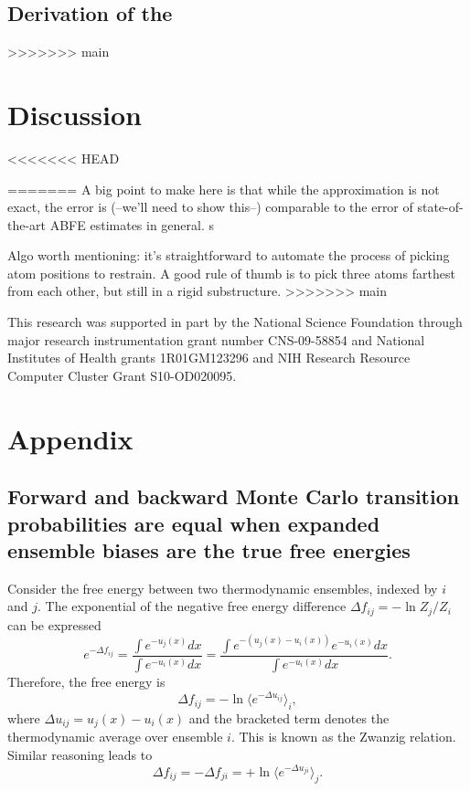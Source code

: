 \documentclass[%
 aip,
rsi,%
 amsmath,amssymb,
 reprint,%
]{revtex4-1}
\begin{document}
\subsection*{Derivation of the }
>>>>>>> main




\section*{Discussion}

<<<<<<< HEAD

=======
A big point to make here is that while the approximation is not exact, the error is (--we'll need to show this--) comparable to the error of state-of-the-art ABFE estimates in general.  s 

Algo worth mentioning: it's straightforward to automate the process of picking atom positions to restrain.  A good rule of thumb is to pick three atoms farthest from each other, but still in a rigid substructure. 
>>>>>>> main

\begin{acknowledgments}
This research was supported in part by the National Science Foundation through major research instrumentation grant number CNS-09-58854 and National Institutes of Health grants 1R01GM123296 and NIH Research Resource Computer Cluster Grant S10-OD020095.
\end{acknowledgments}

%




\section*{Appendix}

\subsection{Forward and backward Monte Carlo transition probabilities are equal when expanded ensemble biases are the true free energies}

Consider the free energy between two thermodynamic ensembles, indexed by $i$ and $j$.  The exponential of the negative free energy difference $\Delta f_{ij} = -\ln Z_j/Z_i$ can be expressed
\begin{equation}
      e^{-\Delta f_{ij}} = \frac{\int e^{-u_j(x)} dx}{\int e^{-u_i(x)} dx}  
            = \frac{\int e^{-(u_j(x)-u_i(x))}e^{-u_i(x)} dx}{\int e^{-u_i(x)} dx}.
\end{equation}
Therefore, the free energy is
\begin{equation}
    \Delta f_{ij} = - \ln \langle e^{-\Delta u_{ij}} \rangle_i,
\end{equation}
where $\Delta u_{ij} = u_j(x)-u_i(x)$ and the bracketed term denotes the thermodynamic average over ensemble $i$. This is known as the Zwanzig relation.\cite{zwanzig1954high} Similar reasoning leads to 
\begin{equation}
    \Delta f_{ij} = -\Delta f_{ji} =  + \ln \langle e^{-\Delta u_{ji}} \rangle_j.
\end{equation}
\end{document}
